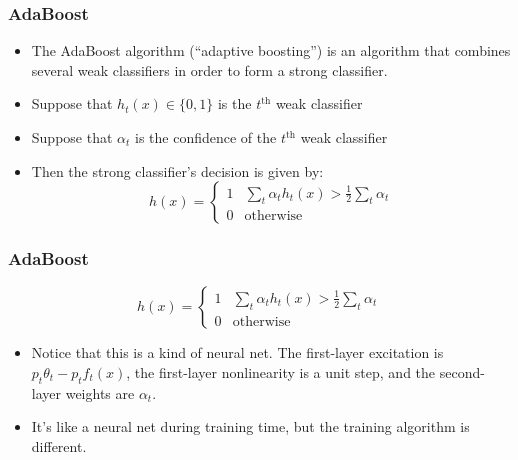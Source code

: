 \documentclass{beamer}
\begin{document}
\begin{frame}
  \frametitle{AdaBoost}

  \begin{itemize}
    \item 
      The AdaBoost algorithm (``adaptive boosting'') is an algorithm that
      combines several weak classifiers in order to form a strong
      classifier.
    \item Suppose that $h_t(x)\in\{0,1\}$ is the $t^{\text{th}}$
      weak classifier
    \item Suppose that $\alpha_t$ is the confidence of the $t^{\text{th}}$ weak classifier
    \item Then the strong classifier's decision is given by:
      \begin{displaymath}
        h(x)=\begin{cases}
        1 & \sum_t \alpha_th_t(x)>\frac{1}{2}\sum_t\alpha_t\\
        0 & \mbox{otherwise}
        \end{cases}
      \end{displaymath}
  \end{itemize}
\end{frame}
    
\begin{frame}
  \frametitle{AdaBoost}

  \begin{displaymath}
    h(x)=\begin{cases}
    1 & \sum_t \alpha_th_t(x)>\frac{1}{2}\sum_t\alpha_t\\
    0 & \mbox{otherwise}
    \end{cases}
  \end{displaymath}

  \begin{itemize}
  \item 
    Notice that this is a kind of neural net.  The first-layer
    excitation is $p_t\theta_t-p_tf_t(x)$, the first-layer
    nonlinearity is a unit step, and the second-layer weights are
    $\alpha_t$.
  \item
    It's like a neural net during training time, but the training
    algorithm is different.
  \end{itemize}
\end{frame}
\end{document}
